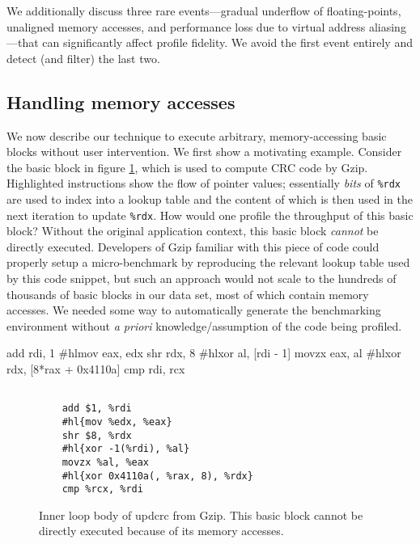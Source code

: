 We additionally discuss three rare events---gradual underflow of floating-points, unaligned memory accesses,
and performance loss due to virtual address aliasing---that
can significantly affect profile fidelity.
We avoid the first event entirely and detect (and filter) the last two.

\subsection{Handling memory accesses}\label{sec:mapping}
We now describe our technique to execute arbitrary, memory-accessing basic blocks
without user intervention.
We first show a motivating example.
Consider the basic block in figure \ref{fig:mem-ex},
which is used to compute CRC code by Gzip.
Highlighted instructions show the flow of pointer values;
essentially \textit{bits} of \verb|%rdx| are used to index into a lookup table
and the content of which is then used in the next iteration to 
update \verb|%rdx|.
How would one profile the throughput of this basic block?
Without the original application context,
this basic block \textit{cannot} be directly executed.
Developers of Gzip familiar with this piece of code could 
properly setup a micro-benchmark by reproducing the
relevant lookup table used by this code snippet,
but such an approach would not scale to the hundreds of 
thousands of basic blocks in our data set, most of which contain memory accesses.
We needed some way to automatically generate the benchmarking environment
without \textit{a priori} knowledge/assumption of the code being profiled.

    add rdi, 1
    #hl{mov eax, edx}
    shr rdx, 8
    #hl{xor al, [rdi - 1]}
    movzx eax, al
    #hl{xor rdx, [8*rax + 0x4110a]}
    cmp rdi, rcx
\fi
\begin{figure}[h]
\begin{Verbatim}[commandchars=\#\{\}]
    
    add $1, %rdi
    #hl{mov %edx, %eax}
    shr $8, %rdx
    #hl{xor -1(%rdi), %al}
    movzx %al, %eax
    #hl{xor 0x4110a(, %rax, 8), %rdx}
    cmp %rcx, %rdi
\end{Verbatim}
\caption{Inner loop body of updcrc from Gzip.
This basic block cannot be directly executed because
of its memory accesses.}
\label{fig:mem-ex}
\end{figure}

